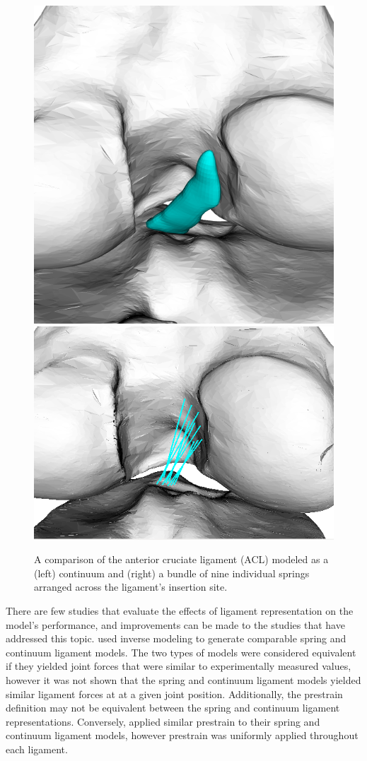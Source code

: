 \begin{figure}
    \centering
    \includegraphics[width=0.35\linewidth]{../img/Knee_ACL_Close.png}
    \includegraphics[width=0.45\linewidth]{../img/Knee_ACL_Springs_Close.png}
    \caption{A comparison of the anterior cruciate ligament (ACL) modeled as a (left) continuum and (right) a bundle of nine individual springs arranged across the ligament's insertion site.}
    \label{fig:continuumSpringAcl}
\end{figure}

There are few studies that evaluate the effects of ligament representation on the model's performance, and improvements can be made to the studies that have addressed this topic. \cite{beidokhti_influence_2017} used inverse modeling to generate comparable spring and continuum ligament models. The two types of models were considered equivalent if they yielded joint forces that were similar to experimentally measured values, however it was not shown that the spring and continuum ligament models yielded similar ligament forces at at a given joint position. Additionally, the prestrain definition may not be equivalent between the spring and continuum ligament representations. Conversely, \cite{orozco_effect_2018} applied similar prestrain to their spring and continuum ligament models, however prestrain was uniformly applied throughout each ligament.

